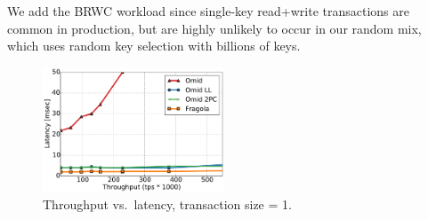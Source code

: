 We add the BRWC workload since single-key read+write transactions are common in production, but are highly unlikely to 
occur in our random mix, which uses random key selection with billions of keys.

\begin{figure}[htb]
	\centering
      	\includegraphics[width=0.48\textwidth]{figs/throughputlatency1.pdf}
	    \caption{Throughput vs.\ latency, transaction size = 1.}
        \label{fig:tl-1}      
\end{figure}


